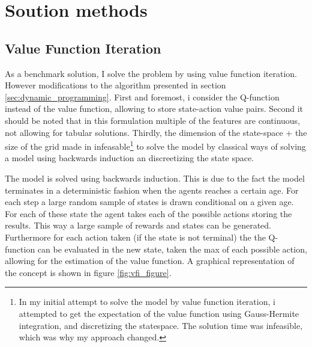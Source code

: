 \section{Soution methods}

\subsection{Value Function Iteration}

As a benchmark solution, I solve the problem by using value function iteration. However modifications to the algorithm presented in section \ref{sec:dynamic_programming}. First and foremost, i consider the Q-function instead of the value function, allowing to store state-action value pairs. Second it should be noted that in this formulation multiple of the features are continuous, not allowing for tabular solutions. Thirdly, the dimension of the state-space + the size of the grid made in infeasable\footnote{In my initial attempt to solve the model by value function iteration, i attempted to get the expectation of the value function using Gauss-Hermite integration, and discretizing the statespace. The solution time was infeasible, which was why my approach changed.} to solve the model by classical ways of solving a model using backwards induction an discreetizing the state space. 

The model is solved using backwards induction. This is due to the fact the model terminates in a deterministic fashion when the agents reaches a certain age. For each step a large random sample of states is drawn conditional on a given age. For each of these state the agent takes each of the possible actions storing the results. This way a large sample of rewards and states can be generated. Furthermore for each action taken (if the state is not terminal) the the Q-function can be evaluated in the new state, taken the max of each possible action, allowing for the estimation of the value function. A graphical representation of the concept is shown in figure \ref{fig:vfi_figure}. 

